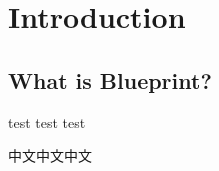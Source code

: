 %

\chapter{Introduction}

\section{What is Blueprint?}

test test test

\begin{center}
\end{center}

中文中文中文